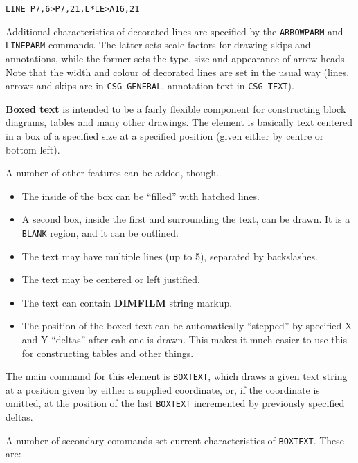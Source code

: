 \documentclass[a4paper,twoside,11pt]{article}
\newcommand{\newpara}{\par\vspace{4mm}\noindent}
\begin{document}
\begin{lstlisting}
LINE P7,6>P7,21,L*LE>A16,21
\end{lstlisting}

\newpara
Additional characteristics of decorated lines are specified by the
\texttt{ARROWPARM} and \texttt{LINEPARM} commands. The latter sets scale
factors for drawing skips and annotations, while the former sets the
type, size and appearance of arrow heads. Note that the width and colour
of decorated lines are set in the usual way (lines, arrows and skips are
in \texttt{CSG\ GENERAL}, annotation text in \texttt{CSG\ TEXT}).

\newpara
\textbf{Boxed text} is intended to be a fairly flexible component for
constructing block diagrams, tables and many other drawings. The element
is basically text centered in a box of a specified size at a specified
position (given either by centre or bottom left).

\newpara
A number of other features can be added, though.

\begin{itemize}
\item
  The inside of the box can be ``filled'' with hatched lines.
\item
  A second box, inside the first and surrounding the text, can be drawn.
  It is a \texttt{BLANK} region, and it can be outlined.
\item
  The text may have multiple lines (up to 5), separated by backslashes.
\item
  The text may be centered or left justified.
\item
  The text can contain \textbf{DIMFILM} string markup.
\item
  The position of the boxed text can be automatically ``stepped'' by
  specified X and Y ``deltas'' after eah one is drawn. This makes it
  much easier to use this for constructing tables and other things.
\end{itemize}

\newpara
The main command for this element is \texttt{BOXTEXT}, which draws a
given text string at a position given by either a supplied coordinate,
or, if the coordinate is omitted, at the position of the last
\texttt{BOXTEXT} incremented by previously specified deltas.

\newpara
A number of secondary commands set current characteristics of
\texttt{BOXTEXT}. These are:
\end{document}
